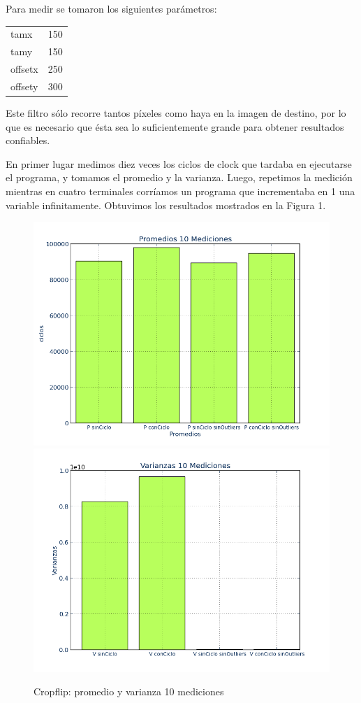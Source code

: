 \documentclass[a4paper]{article}
\begin{document}
Para medir se tomaron los siguientes parámetros:

\begin{tabular}{l|r} %
 tamx & 150 \\
 tamy & 150 \\
 offsetx & 250 \\
 offsety & 300 \\
\end{tabular}

\smallskip

Este filtro sólo recorre tantos píxeles como haya en la imagen de destino, por lo que es necesario que ésta sea lo suficientemente grande para obtener resultados confiables.

En primer lugar medimos diez veces los ciclos de clock que tardaba en ejecutarse el programa, y tomamos el promedio y la varianza. Luego, repetimos la medición mientras en cuatro terminales corríamos un programa que incrementaba en 1 una variable infinitamente. Obtuvimos los resultados mostrados en la Figura 1.

\begin{figure}[htbp]
\centering
\includegraphics[scale=0.33]{imagenes/promediosFosqui.png}
\includegraphics[scale=0.33]{imagenes/varianzaFosqui.png}
\caption{Cropflip: promedio y varianza 10 mediciones} 
\label{fig:grafico_esp-var_cropflip}
\end{figure}
\end{document}
